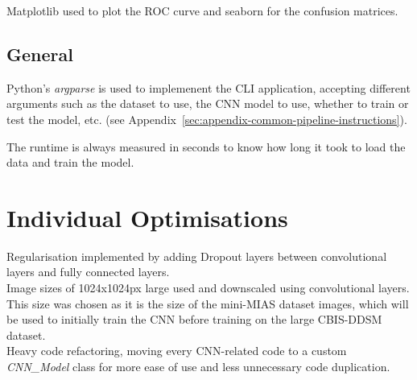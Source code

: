 Matplotlib used to plot the ROC curve and seaborn for the confusion matrices.


\subsection{General}

Python's \textit{argparse} is used to implemenent the CLI application, accepting different arguments such as the dataset to use, the CNN model to use, whether to train or test the model, etc. (see Appendix~\ref{sec:appendix-common-pipeline-instructions}).

The runtime is always measured in seconds to know how long it took to load the data and train the model.


\section{Individual Optimisations}

Regularisation implemented by adding Dropout layers between convolutional layers and fully connected layers.\\

Image sizes of 1024x1024px large used and downscaled using convolutional layers. This size was chosen as it is the size of the mini-MIAS dataset images, which will be used to initially train the CNN before training on the large CBIS-DDSM dataset.\\

Heavy code refactoring, moving every CNN-related code to a custom \textit{CNN\_Model} class for more ease of use and less unnecessary code duplication.




